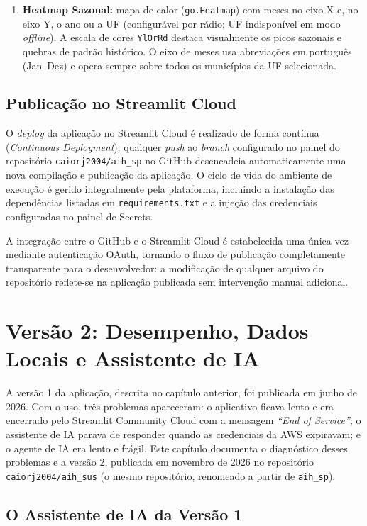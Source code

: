 \documentclass[12pt,a4paper]{report}
\begin{document}
\begin{enumerate}
    \item \textbf{Heatmap Sazonal:} mapa de calor (\texttt{go.Heatmap}) com meses
    no eixo X e, no eixo Y, o ano ou a UF (configurável por rádio; UF indisponível em
    modo \textit{offline}). A escala de cores \texttt{YlOrRd} destaca visualmente
    os picos sazonais e quebras de padrão histórico. O eixo de meses usa abreviações
    em português (Jan--Dez) e opera sempre sobre todos os municípios da UF selecionada.
\end{enumerate}

\section{Publicação no Streamlit Cloud}

O \textit{deploy} da aplicação no Streamlit Cloud é realizado de forma contínua
(\textit{Continuous Deployment}): qualquer \textit{push} ao \textit{branch} configurado
no painel do repositório \texttt{caiorj2004/aih\_sp} no GitHub desencadeia automaticamente uma
nova compilação e publicação da aplicação. O ciclo de vida do ambiente de execução é
gerido integralmente pela plataforma, incluindo a instalação das dependências listadas
em \texttt{requirements.txt} e a injeção das credenciais configuradas no painel de
Secrets.

A integração entre o GitHub e o Streamlit Cloud é estabelecida uma única vez mediante
autenticação OAuth, tornando o fluxo de publicação completamente transparente para o
desenvolvedor: a modificação de qualquer arquivo do repositório reflete-se na
aplicação publicada sem intervenção manual adicional.

\chapter{Versão 2: Desempenho, Dados Locais e Assistente de IA}\label{cap:v2}

A versão 1 da aplicação, descrita no capítulo anterior, foi publicada em junho de 2026.
Com o uso, três problemas apareceram: o aplicativo ficava lento e era encerrado pelo
Streamlit Community Cloud com a mensagem \textit{``End of Service''}; o assistente de IA
parava de responder quando as credenciais da AWS expiravam; e o agente de IA era lento e
frágil. Este capítulo documenta o diagnóstico desses problemas e a versão 2, publicada em
novembro de 2026 no repositório \texttt{caiorj2004/aih\_sus} (o mesmo repositório,
renomeado a partir de \texttt{aih\_sp}).

\section{O Assistente de IA da Versão 1}
\end{document}
